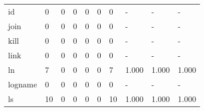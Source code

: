 \begin{longtable}{lp{2.0cm}p{2.0cm}p{2.0cm}p{2.0cm}p{2.0cm}p{2.0cm}p{2.0cm}p{2.0cm}p{2.0cm}}
id        &                      0 &                                  0 &                                 0 &                                0 &                                 0 &                               0 &                                    - &                                      - &                                    - \\
join      &                      0 &                                  0 &                                 0 &                                0 &                                 0 &                               0 &                                    - &                                      - &                                    - \\
kill      &                      0 &                                  0 &                                 0 &                                0 &                                 0 &                               0 &                                    - &                                      - &                                    - \\
link      &                      0 &                                  0 &                                 0 &                                0 &                                 0 &                               0 &                                    - &                                      - &                                    - \\
ln        &                      7 &                                  0 &                                 0 &                                0 &                                 0 &                               7 &                                1.000 &                                  1.000 &                                1.000 \\
logname   &                      0 &                                  0 &                                 0 &                                0 &                                 0 &                               0 &                                    - &                                      - &                                    - \\
ls        &                     10 &                                  0 &                                 0 &                                0 &                                 0 &                              10 &                                1.000 &                                  1.000 &                                1.000 \\

\end{longtable}
